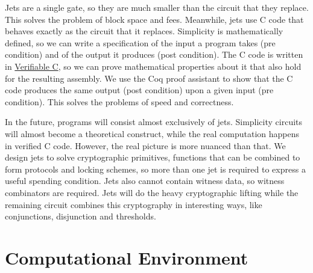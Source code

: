 Jets are a single gate,
so they are much smaller than the circuit that they replace.
This solves the problem of block space and fees.
%
Meanwhile,
jets use C code that behaves exactly as the circuit that it replaces.
Simplicity is mathematically defined,
so we can write a specification of the input a program takes (pre condition)
and of the output it produces (post condition).
The C code is written in \href{https://vst.cs.princeton.edu/}{Verifiable C},
so we can prove mathematical properties about it that also hold for the resulting assembly.
We use the Coq proof assistant to show that the C code produces the same output (post condition) upon a given input (pre condition).
This solves the problems of speed and correctness.

In the future,
programs will consist almost exclusively of jets.
Simplicity circuits will almost become a theoretical construct,
while the real computation happens in verified C code.
However,
the real picture is more nuanced than that.
We design jets to solve cryptographic primitives,
functions that can be combined to form protocols and locking schemes,
so more than one jet is required to express a useful spending condition.
Jets also cannot contain witness data,
so witness combinators are required.
Jets will do the heavy cryptographic lifting while the remaining circuit combines this cryptography in interesting ways,
like conjunctions, disjunction and thresholds.

\section{Computational Environment}%
\label{sec:environment}



